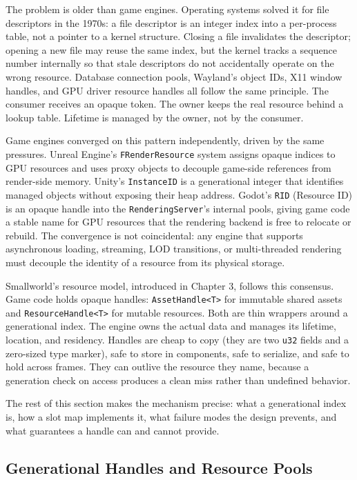 \documentclass[
  11pt,
  letterpaper,
  DIV=11,
  numbers=noendperiod,
  twoside,
  open=right]{scrreprt}
\begin{document}
The problem is older than game engines. Operating systems solved it for
file descriptors in the 1970s: a file descriptor is an integer index
into a per-process table, not a pointer to a kernel structure. Closing a
file invalidates the descriptor; opening a new file may reuse the same
index, but the kernel tracks a sequence number internally so that stale
descriptors do not accidentally operate on the wrong resource. Database
connection pools, Wayland's object IDs, X11 window handles, and GPU
driver resource handles all follow the same principle. The consumer
receives an opaque token. The owner keeps the real resource behind a
lookup table. Lifetime is managed by the owner, not by the consumer.

Game engines converged on this pattern independently, driven by the same
pressures. Unreal Engine's \texttt{FRenderResource} system assigns
opaque indices to GPU resources and uses proxy objects to decouple
game-side references from render-side memory. Unity's
\texttt{InstanceID} is a generational integer that identifies managed
objects without exposing their heap address. Godot's \texttt{RID}
(Resource ID) is an opaque handle into the \texttt{RenderingServer}'s
internal pools, giving game code a stable name for GPU resources that
the rendering backend is free to relocate or rebuild. The convergence is
not coincidental: any engine that supports asynchronous loading,
streaming, LOD transitions, or multi-threaded rendering must decouple
the identity of a resource from its physical storage.

Smallworld's resource model, introduced in Chapter 3, follows this
consensus. Game code holds opaque handles:
\texttt{AssetHandle\textless{}T\textgreater{}} for immutable shared
assets and \texttt{ResourceHandle\textless{}T\textgreater{}} for mutable
resources. Both are thin wrappers around a generational index. The
engine owns the actual data and manages its lifetime, location, and
residency. Handles are cheap to copy (they are two \texttt{u32} fields
and a zero-sized type marker), safe to store in components, safe to
serialize, and safe to hold across frames. They can outlive the resource
they name, because a generation check on access produces a clean miss
rather than undefined behavior.

The rest of this section makes the mechanism precise: what a
generational index is, how a slot map implements it, what failure modes
the design prevents, and what guarantees a handle can and cannot
provide.

\subsection{Generational Handles and Resource
Pools}\label{sec-generational-handles}
\end{document}
